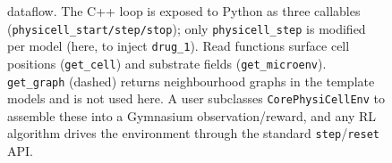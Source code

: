 \begin{figure}[t]
  \caption{\physigym{} dataflow. The \physicell{} C++ loop is exposed to Python as
    three callables (\texttt{physicell\_start/step/stop}); only \texttt{physicell\_step}
    is modified per model (here, to inject \texttt{drug\_1}). Read functions
    surface cell positions (\texttt{get\_cell}) and substrate fields
    (\texttt{get\_microenv}). \texttt{get\_graph} (dashed) returns
    neighbourhood graphs in the template models and is not used here. A user subclasses
    \texttt{CorePhysiCellEnv} to assemble these into a Gymnasium observation/reward,
    and any RL algorithm drives the environment through the standard
    \texttt{step}/\texttt{reset} API.}
  \label{fig:framework}
\end{figure}
